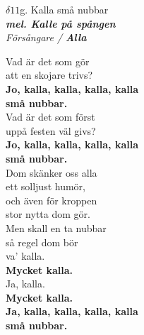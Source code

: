 \documentclass[a6paper,10pt]{article}
\newcommand{\mel}[1]{\small\textbf{\textit{mel. #1 \\}}}
\begin{document}
\newpage
\setlength{\oddsidemargin}{-0.47in}
\noindent
\begin{center}
\Large $\delta11$g. Kalla små nubbar\\ 
\mel{Kalle på spången}
\textit{Försångare / \textbf{Alla}}
\end{center}
Vad är det som gör \\
att en skojare trivs? \\
\textbf{Jo, kalla, kalla, kalla, kalla \\
små nubbar. \\}
Vad är det som först \\
uppå festen väl givs? \\
\textbf{Jo, kalla, kalla, kalla, kalla \\
små nubbar. \\}
Dom skänker oss alla \\
ett solljust humör, \\
och även för kroppen \\
stor nytta dom gör. \\
Men skall en ta nubbar \\
så regel dom bör \\
va' kalla. \\
\textbf{Mycket kalla.\\}
Ja, kalla. \\
\textbf{Mycket kalla.\\
Ja, kalla, kalla, kalla, kalla \\
små nubbar. }
\end{document}
